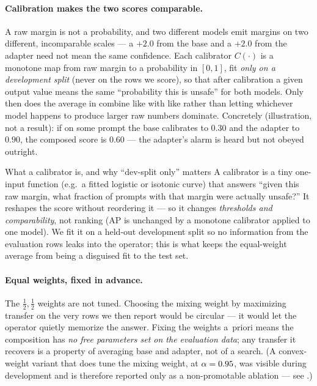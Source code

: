 \paragraph{Calibration makes the two scores comparable.}
A raw margin is not a probability, and two different models emit margins on two different,
incomparable scales --- a $+2.0$ from the base and a $+2.0$ from the adapter need not mean the
same confidence. Each calibrator $C(\cdot)$ is a monotone map from raw margin to a probability
in $[0,1]$, fit \emph{only on a development split} (never on the rows we score), so that after
calibration a given output value means the same ``probability this is unsafe'' for both models.
Only then does the average in  combine like with like rather than letting whichever
model happens to produce larger raw numbers dominate. Concretely (illustration, not a result):
if on some prompt the base calibrates to $0.30$ and the adapter to $0.90$, the composed score is
$0.60$ --- the adapter's alarm is heard but not obeyed outright.

\begin{background}{What a calibrator is, and why ``dev-split only'' matters}
A calibrator is a tiny one-input function (e.g.\ a fitted logistic or isotonic curve) that
answers ``given this raw margin, what fraction of prompts with that margin were actually
unsafe?'' It reshapes the score without reordering it --- so it changes \emph{thresholds and
comparability}, not ranking (AP is unchanged by a monotone calibrator applied to one model). We
fit it on a held-out development split so no information from the evaluation rows leaks into the
operator; this is what keeps the equal-weight average from being a disguised fit to the test set.
\end{background}

\paragraph{Equal weights, fixed in advance.}
The $\tfrac12,\tfrac12$ weights are not tuned. Choosing the mixing weight by maximizing transfer
on the very rows we then report would be circular --- it would let the operator quietly memorize
the answer. Fixing the weights a~priori means the composition has \emph{no free parameters set on
the evaluation data}; any transfer it recovers is a property of averaging base and adapter, not of
a search. (A convex-weight variant that does tune the mixing weight, at $\alpha=0.95$,
was visible during development and is therefore reported only as a non-promotable ablation ---
see .)


